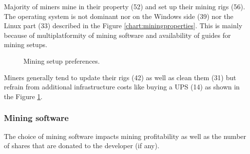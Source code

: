 \documentclass[
  printed, %
  table,   %
  lof,     %
  lot,     %
           oneside, color
]{fithesis3}
\begin{document}
\vspace{-2em}
Majority of miners mine in their property (52) and set up their mining rigs (56). The operating system is not dominant nor on the Windows side (39) nor the Linux part (33) described in the Figure \ref{chart:miningproperties}. This is mainly because of multiplatformity of mining software and availability of guides for mining setups. 
\vspace{-2em} %
\begin{center}
\begin{figure}[H]
\caption{Mining setup preferences.}
\label{chart:mininghabbits}\end{figure}\end{center}

Miners generally tend to update their rigs (42) as well as clean them (31) but refrain from additional infrastructure costs like buying a UPS (14) as shown in the Figure \ref{chart:mininghabbits}.

\subsubsection{Mining software}
The choice of mining software impacts mining profitability as well as the number of shares that are donated to the developer (if any). 
\end{document}
